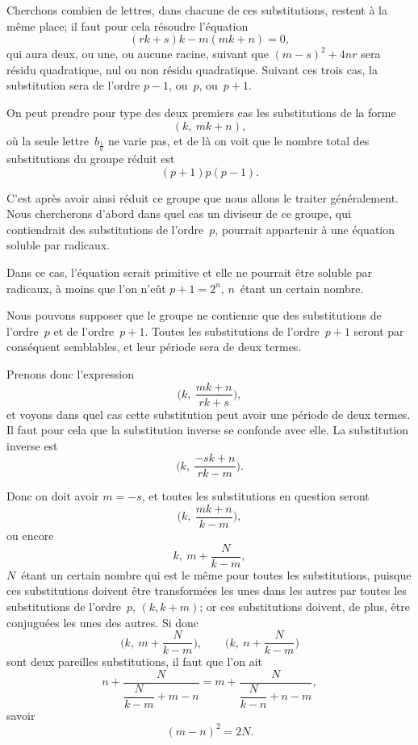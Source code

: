 \documentclass[leqno,12pt]{book}[2005/09/16]
\newcommand{\efrac}[2]{\tfrac{#1}{#2}}
\begin{document}
Cherchons combien de lettres, dans chacune de ces substitutions,
restent à la même place; il faut pour cela résoudre l'équation
\[
(rk + s)k - m(mk + n) = 0,
\]
qui aura deux, ou une, ou aucune racine, suivant que $(m - s)^{2} + 4nr$
sera résidu quadratique, nul ou non résidu quadratique. Suivant
ces trois cas, la substitution sera de l'ordre $p - 1$, ou~$p$, ou~$p + 1$.

On peut prendre pour type des deux premiers cas les substitutions
de la forme
\[
(k,\ mk + n),
\]
où la seule lettre~$b_{\efrac{1}{0}}$ ne varie pas, et de là on voit que le nombre
total des substitutions du groupe réduit est
\[
(p + 1)p(p - 1).
\]

C'est après avoir ainsi réduit ce groupe que nous allons le
traiter généralement. Nous chercherons d'abord dans quel cas un
diviseur de ce groupe, qui contiendrait des substitutions de
l'ordre~$p$, pourrait appartenir à une équation soluble par radicaux.

Dans ce cas, l'équation serait primitive et elle ne pourrait être
soluble par radicaux, à moins que l'on n'eût $p + 1 = 2^{n}$, $n$~étant
un certain nombre.

Nous pouvons supposer que le groupe ne contienne que des
substitutions de l'ordre~$p$ et de l'ordre~$p + 1$. Toutes les substitutions
de l'ordre~$p + 1$ seront par conséquent semblables, et leur
période sera de deux termes.

Prenons donc l'expression
\[
\biggl(k,\ \frac{mk + n}{rk + s}\biggr),
\]
et voyons dans quel cas cette substitution peut avoir une période
de deux termes. Il faut pour cela que la substitution inverse se
confonde avec elle. La substitution inverse est
\[
\biggl(k,\ \frac{-sk + n}{rk - m}\biggr).
\]

Donc on doit avoir $m = -s$, et toutes les substitutions en
question seront
\[
\biggl(k,\ \frac{mk + n}{k - m}\biggr),
\]
ou encore
\[
k,\ m + \frac{N}{k - m},
\]
$N$~étant un certain nombre qui est le même pour toutes les substitutions,
puisque ces substitutions doivent être transformées les
unes dans les autres par toutes les substitutions de l'ordre~$p$,
$(k, k+m)$; or ces substitutions doivent, de plus, être conjuguées
les unes des autres. Si donc
\[
\biggl(k,\ m + \frac{N}{k - m}\biggr), \qquad
\biggl(k,\ n + \frac{N}{k - m}\biggr)
\]
sont deux pareilles substitutions, il faut que l'on ait
\[
n + \frac{N}{\dfrac{N}{k-m} + m - n} =
m + \frac{N}{\dfrac{N}{k-n} + n - m},
\]
savoir
\[
(m - n)^{2} = 2N.
\]
\end{document}
